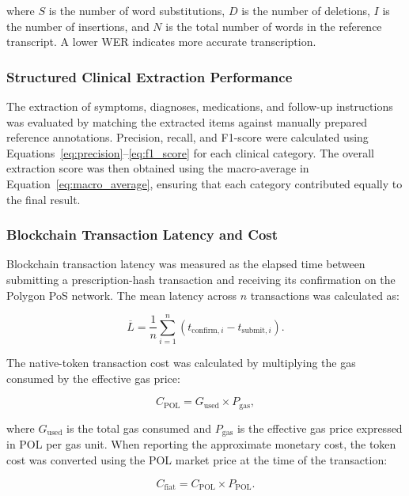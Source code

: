 where $S$ is the number of word substitutions, $D$ is the number of deletions, $I$ is the number of insertions, and $N$ is the total number of words in the reference transcript. A lower WER indicates more accurate transcription.

\subsubsection{Structured Clinical Extraction Performance}
The extraction of symptoms, diagnoses, medications, and follow-up instructions was evaluated by matching the extracted items against manually prepared reference annotations. Precision, recall, and F1-score were calculated using Equations~\ref{eq:precision}--\ref{eq:f1_score} for each clinical category. The overall extraction score was then obtained using the macro-average in Equation~\ref{eq:macro_average}, ensuring that each category contributed equally to the final result.

\subsubsection{Blockchain Transaction Latency and Cost}
Blockchain transaction latency was measured as the elapsed time between submitting a prescription-hash transaction and receiving its confirmation on the Polygon PoS network. The mean latency across $n$ transactions was calculated as:

\begin{equation}
    \overline{L} = \frac{1}{n}\sum_{i=1}^{n}\left(t_{\mathrm{confirm},i} - t_{\mathrm{submit},i}\right).
    \label{eq:blockchain_latency}
\end{equation}

The native-token transaction cost was calculated by multiplying the gas consumed by the effective gas price:

\begin{equation}
    C_{\mathrm{POL}} = G_{\mathrm{used}} \times P_{\mathrm{gas}},
    \label{eq:gas_cost}
\end{equation}

where $G_{\mathrm{used}}$ is the total gas consumed and $P_{\mathrm{gas}}$ is the effective gas price expressed in POL per gas unit. When reporting the approximate monetary cost, the token cost was converted using the POL market price at the time of the transaction:

\begin{equation}
    C_{\mathrm{fiat}} = C_{\mathrm{POL}} \times P_{\mathrm{POL}}.
    \label{eq:fiat_cost}
\end{equation}


